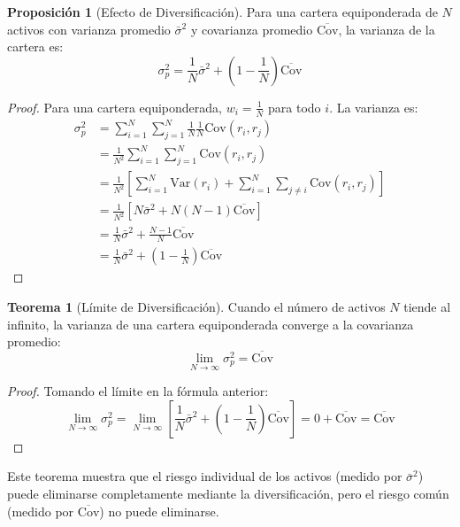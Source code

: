 \documentclass[12pt,a4paper]{article}
\theoremstyle{definition}
\newtheorem{teorema}{Teorema}[section]
\newtheorem{proposicion}{Proposición}[section]
\newcommand{\Var}{\text{Var}}
\newcommand{\Cov}{\text{Cov}}
\begin{document}
\begin{proposicion}[Efecto de Diversificación]
Para una cartera equiponderada de $N$ activos con varianza promedio $\bar{\sigma}^2$ y covarianza promedio $\overline{\Cov}$, la varianza de la cartera es:
\begin{equation}
\sigma_p^2 = \frac{1}{N} \bar{\sigma}^2 + \left(1 - \frac{1}{N}\right) \overline{\Cov}
\end{equation}
\end{proposicion}

\begin{proof}
Para una cartera equiponderada, $w_i = \frac{1}{N}$ para todo $i$. La varianza es:
\begin{align*}
\sigma_p^2 &= \sum_{i=1}^{N} \sum_{j=1}^{N} \frac{1}{N} \frac{1}{N} \Cov(r_i, r_j) \\
&= \frac{1}{N^2} \sum_{i=1}^{N} \sum_{j=1}^{N} \Cov(r_i, r_j) \\
&= \frac{1}{N^2} \left[\sum_{i=1}^{N} \Var(r_i) + \sum_{i=1}^{N} \sum_{j \neq i} \Cov(r_i, r_j)\right] \\
&= \frac{1}{N^2} \left[N \bar{\sigma}^2 + N(N-1) \overline{\Cov}\right] \\
&= \frac{1}{N} \bar{\sigma}^2 + \frac{N-1}{N} \overline{\Cov} \\
&= \frac{1}{N} \bar{\sigma}^2 + \left(1 - \frac{1}{N}\right) \overline{\Cov}
\end{align*}
\end{proof}

\begin{teorema}[Límite de Diversificación]
Cuando el número de activos $N$ tiende al infinito, la varianza de una cartera equiponderada converge a la covarianza promedio:
\begin{equation}
\lim_{N \to \infty} \sigma_p^2 = \overline{\Cov}
\end{equation}
\end{teorema}

\begin{proof}
Tomando el límite en la fórmula anterior:
$$\lim_{N \to \infty} \sigma_p^2 = \lim_{N \to \infty} \left[\frac{1}{N} \bar{\sigma}^2 + \left(1 - \frac{1}{N}\right) \overline{\Cov}\right] = 0 + \overline{\Cov} = \overline{\Cov}$$
\end{proof}

Este teorema muestra que el riesgo individual de los activos (medido por $\bar{\sigma}^2$) puede eliminarse completamente mediante la diversificación, pero el riesgo común (medido por $\overline{\Cov}$) no puede eliminarse.
\end{document}
